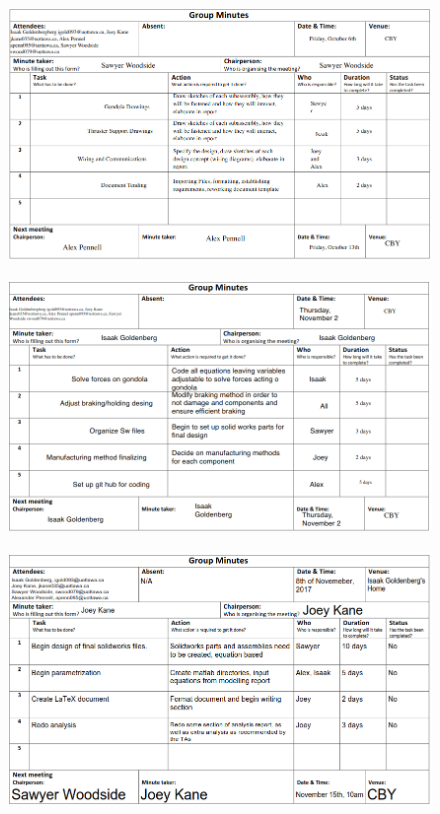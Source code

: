 \documentclass[../main.tex]{subfiles}
\begin{document}
		\begin{figure}[H]
			\centering
			\includegraphics[height=0.8\textheight]{img/minutes/2017-10-06.PNG}
		\end{figure}
		\begin{figure}[H]
			\centering
			\includegraphics[height=0.8\textheight]{img/minutes/2017-11-02.PNG}
		\end{figure}
		\begin{figure}[H]
			\centering
			\includegraphics[height=0.8\textheight]{img/minutes/2017-11-08.PNG}
		\end{figure}
\end{document}

